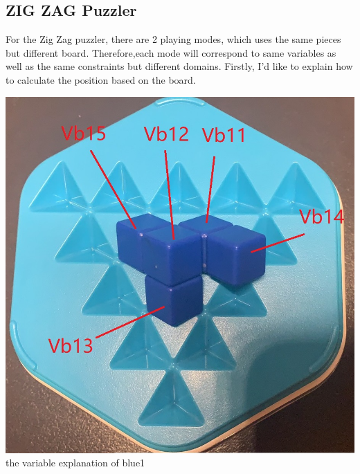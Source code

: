 \subsection{ZIG ZAG Puzzler}
For the Zig Zag puzzler, there are 2 playing modes, which uses the same pieces but different board. Therefore,each mode will correspond to same variables as well as the same constraints but different domains.
Firstly, I'd like to explain how to calculate the position based on the board.
\begin{center}
\includegraphics[scale=0.2]{figs/3Dblue1.jpg}\\
the variable explanation of blue1\\
\end{center}
